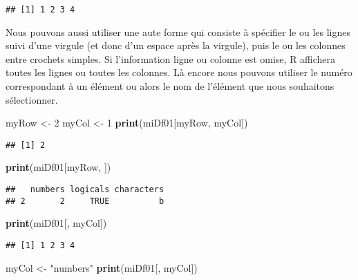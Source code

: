 \documentclass[]{book}
\newenvironment{Shaded}{\begin{snugshade}}{\end{snugshade}}
\newcommand{\KeywordTok}[1]{\textcolor[rgb]{0.13,0.29,0.53}{\textbf{#1}}}
\newcommand{\DecValTok}[1]{\textcolor[rgb]{0.00,0.00,0.81}{#1}}
\newcommand{\StringTok}[1]{\textcolor[rgb]{0.31,0.60,0.02}{#1}}
\newcommand{\NormalTok}[1]{#1}
\theoremstyle{definition}
\theoremstyle{definition}
\theoremstyle{definition}
\theoremstyle{remark}
\begin{document}
\begin{verbatim}
## [1] 1 2 3 4
\end{verbatim}

Nous pouvons aussi utiliser une aute forme qui consiste à spécifier le
ou les lignes suivi d'une virgule (et donc d'un espace après la
virgule), puis le ou les colonnes entre crochets simples. Si
l'information ligne ou colonne est omise, R affichera toutes les lignes
ou toutes les colonnes. Là encore nous pouvons utiliser le numéro
correspondant à un élément ou alors le nom de l'élément que nous
souhaitons sélectionner.

\begin{Shaded}
\begin{Highlighting}[]
\NormalTok{myRow <-}\StringTok{ }\DecValTok{2}
\NormalTok{myCol <-}\StringTok{ }\DecValTok{1}
\KeywordTok{print}\NormalTok{(miDf01[myRow, myCol])}
\end{Highlighting}
\end{Shaded}

\begin{verbatim}
## [1] 2
\end{verbatim}

\begin{Shaded}
\begin{Highlighting}[]
\KeywordTok{print}\NormalTok{(miDf01[myRow, ])}
\end{Highlighting}
\end{Shaded}

\begin{verbatim}
##   numbers logicals characters
## 2       2     TRUE          b
\end{verbatim}

\begin{Shaded}
\begin{Highlighting}[]
\KeywordTok{print}\NormalTok{(miDf01[, myCol])}
\end{Highlighting}
\end{Shaded}

\begin{verbatim}
## [1] 1 2 3 4
\end{verbatim}

\begin{Shaded}
\begin{Highlighting}[]
\NormalTok{myCol <-}\StringTok{ "numbers"}
\KeywordTok{print}\NormalTok{(miDf01[, myCol])}
\end{Highlighting}
\end{Shaded}
\end{document}
